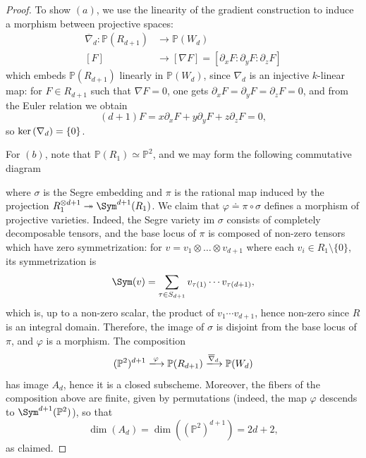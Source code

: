 \documentclass[11pt]{amsart} %
\newcommand{\lar}{\longrightarrow}
\theoremstyle{definition}
\def\ker{{\rm ker}\,}
\begin{document}
\begin{proof}
To show $(a)$, we use the linearity of the gradient construction to induce a morphism between projective spaces: 
\begin{align*}
\overline{\nabla}_d: \mathbb{P}(R_{d+1}) &\lar \mathbb{P}(W_d)\\
[F]&\lar [\nabla F]=[\partial_x F: \partial_y F: \partial_z F]
\end{align*}
which embeds $\mathbb{P}(R_{d+1})$ linearly in $\mathbb{P}(W_d)$, since $\nabla_d$ is an injective $k$-linear map: for $F \in R_{d+1}$ such that $\nabla F = 0$, one gets $\partial_x F = \partial_y F = \partial_z F = 0$, and from the Euler relation we obtain
$$
(d+1) F = x \partial_x F + y \partial_y F + z \partial_z F = 0,
$$
so $\ker(\nabla_d) = \{0\}$.

For $(b)$, note that $\mathbb{P}(R_1) \simeq \mathbb{P}^2$, and we may form the following commutative diagram
\begin{center}
\end{center}
where $\sigma$ is the Segre embedding and $\pi$ is the rational map induced by the projection $R_1^{\otimes d+1} \twoheadrightarrow \Sym^{d+1}(R_1)$. We claim that $\varphi \doteq \pi \circ \sigma$ defines a morphism of projective varieties. Indeed, the Segre variety $\text{im }\sigma$ consists of completely decomposable tensors, and the base locus of $\pi$ is composed of non-zero tensors which have zero symmetrization: for $v = v_1 \otimes \ldots \otimes v_{d+1}$ where each $v_i \in R_1 \setminus \{0\}$, its symmetrization is
$$
\Sym(v) = \sum_{\tau \in S_{d+1}} v_{\tau(1)} \cdots v_{\tau(d+1)},
$$
which is, up to a non-zero scalar, the product of $v_1 \cdots v_{d+1}$, hence non-zero since $R$ is an integral domain. Therefore, the image of $\sigma$ is disjoint from the base locus of $\pi$, and $\varphi$ is a morphism. The composition
$$
(\mathbb{P}^2)^{d+1} \xlongrightarrow{\varphi} \mathbb{P}(R_{d+1}) \xlongrightarrow{\overline{\nabla}_d} \mathbb{P}(W_d)
$$
has image $A_d$, hence it is a closed subscheme. Moreover, the fibers of the composition above are finite, given by permutations (indeed, the map $\varphi$ descends to $\Sym^{d+1}(\mathbb{P}^2)$), so that
$$
\dim(A_d) = \dim((\mathbb{P}^2)^{d+1}) = 2d+2,
$$
as claimed.
\end{proof}
\end{document}
